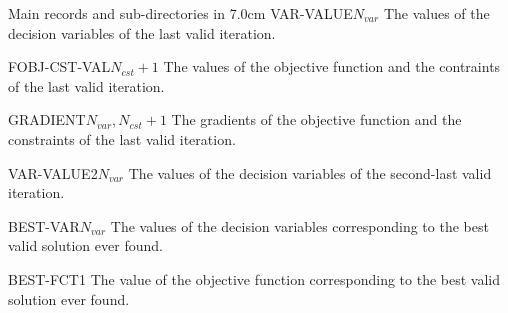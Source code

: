 \begin{DescriptionEnregistrement}{Main records and sub-directories in }{7.0cm}
\RealEnr
{VAR-VALUE}{$N_{var}$}{}
{The values of the decision variables of the last valid iteration.}

\RealEnr
{FOBJ-CST-VAL}{$N_{cst}+1$}{}
{The values of the objective function and the contraints of the last valid iteration.}

\RealEnr
{GRADIENT}{$N_{var}, N_{cst}+1$}{}
{The gradients of the objective function and the constraints of the last valid iteration.}

\RealEnr
{VAR-VALUE2}{$N_{var}$}{}
{The values of the decision variables of the second-last valid iteration.}

\RealEnr
{BEST-VAR}{$N_{var}$}{}
{The values of the decision variables corresponding to the best valid solution ever found.}

\RealEnr
{BEST-FCT}{1}{}
{The value of the objective function corresponding to the best valid solution ever found.}

\end{DescriptionEnregistrement}
